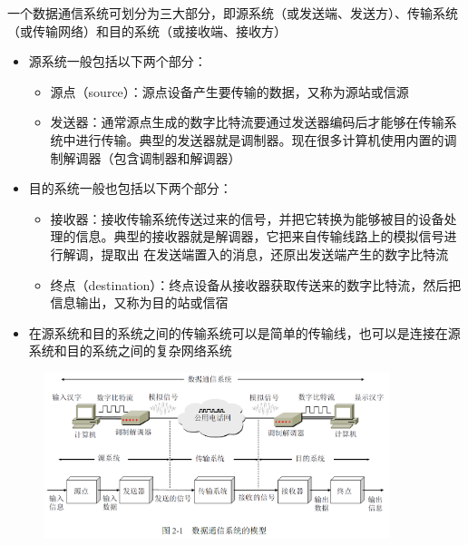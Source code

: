 \documentclass[cs4size,a4paper,10pt]{ctexart}
\begin{document}
	一个数据通信系统可划分为三大部分，即源系统（或发送端、发送方）、传输系统（或传输网络）和目的系统（或接收端、接收方）
	\begin{itemize}
		\item 源系统一般包括以下两个部分：
		\begin{itemize}
			\item 源点（source）：源点设备产生要传输的数据，又称为源站或信源
			\item 发送器：通常源点生成的数字比特流要通过发送器编码后才能够在传输系统中进行传输。典型的发送器就是调制器。现在很多计算机使用内置的调制解调器（包含调制器和解调器）
		\end{itemize}
		\item 目的系统一般也包括以下两个部分：
		\begin{itemize}
			\item 接收器：接收传输系统传送过来的信号，并把它转换为能够被目的设备处理的信息。典型的接收器就是解调器，它把来自传输线路上的模拟信号进行解调，提取出 在发送端置入的消息，还原出发送端产生的数字比特流
			\item 终点（destination）：终点设备从接收器获取传送来的数字比特流，然后把信息输出，又称为目的站或信宿
		\end{itemize}
		\item 在源系统和目的系统之间的传输系统可以是简单的传输线，也可以是连接在源系统和目的系统之间的复杂网络系统
	\end{itemize}

	\begin{figure}[H]
		\centering
		\includegraphics[width=0.9\textwidth]{img/2.1}
	\end{figure}
\end{document}
